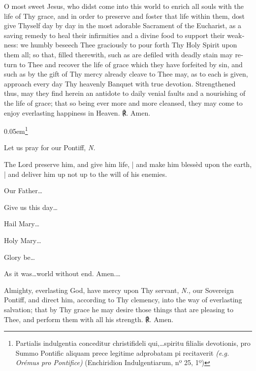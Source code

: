 \begin{otherlanguage}{english}{\par}


O most sweet Jesus, who didst come into this world to enrich all souls with the life of Thy grace, and in order to preserve and foster that life within them, dost give Thyself day by day in the most adorable Sacrament of the Eucharist, as a saving remedy to heal their infirmities and a divine food to support their weakness: we humbly beseech Thee graciously to pour forth Thy Holy Spirit upon them all; so that, filled therewith, such as are defiled with deadly stain may return to Thee and recover the life of grace which they have forfeited by sin, and such as by the gift of Thy mercy already cleave to Thee may, as to each is given, approach every day Thy heavenly Banquet with true devotion. Strengthened thus, may they find herein an antidote to daily venial faults and a nourishing of the life of grace; that so being ever more and more cleansed, they may come to enjoy everlasting happiness in Heaven. ℟. Amen.

\kern 0.05em\footnote{\raggedright{Partialis indulgentia conceditur christifideli qui,…spiritu filialis devotionis, pro Summo Pontific aliquam prece legitime adprobatam pi recitaverit \textit{(e.g. Orémus pro Pontifice)} (Enchiridion Indulgentiarum, nº 25, 1º)}}

\noindent \vv Let us pray for our Pontiff, \textit{N.}

\noindent \rr The Lord preserve him, and give him life, | and make him blessèd upon the earth, | and deliver him up not up to the will of his enemies.

\noindent \vv Our Father…

\noindent \rr Give us this day…

\noindent \vv Hail Mary…

\noindent \rr Holy Mary…

\noindent \vv  Glory be…

\noindent \rr As it was…world without end. Amen.…


Almighty, everlasting God, have mercy upon Thy servant, \textit{N.,} our Sovereign Pontiff, and direct him, according to Thy clemency, into the way of everlasting salvation; that by Thy grace he may desire those things that are pleasing to Thee, and perform them with all his strength. ℟. Amen.



\end{otherlanguage}